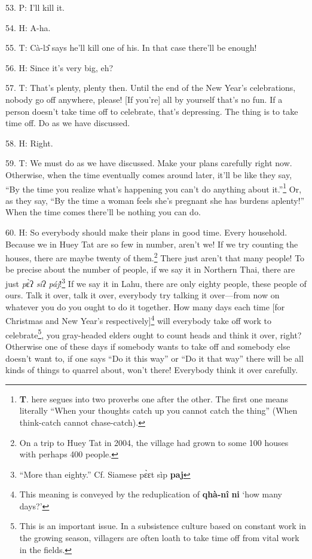 53. P: I'll kill it.

54. H: A-ha.

55. T: Cà-lɔ̂ says he'll kill one of his. In that case there'll be enough!

56. H: Since it's very big, eh?

57. T: That's plenty, plenty then. Until the end of the New Year's celebrations,
nobody go off anywhere, please! [If you're] all by yourself that's no fun. If
a person doesn't take time off to celebrate, that's depressing. The thing is to
take time off. Do as we have discussed.

58. H: Right.

59. T: We must do as we have discussed. Make your plans carefully right now.
Otherwise, when the time eventually comes around later, it'll be like they say,
``By the time you realize what's happening you can't do anything about it.''\footnote{\textbf{T}. here segues into two proverbs one after the other. The first one means literally ``When your thoughts catch up you cannot catch the thing'' (When think-catch cannot chase-catch).}
Or, as they say, ``By the time a woman feels she's pregnant she has burdens aplenty!''
When the time comes there'll be nothing you can do.

60. H: So everybody should make their plans in good time. Every household. Because
we in Huey Tat are so few in number, aren't we! If we try counting the houses,
there are maybe twenty of them.\footnote{On a trip to Huey Tat in 2004, the village had grown to some 100 houses with perhaps 400 people.} There just aren't that many people! To be
precise about the number of people, if we say it in Northern Thai, there are just
\textit{p}ɛ̀ʔ\textit{ sî}ʔ\textit{ páj}!\footnote{``More than eighty.'' Cf. Siamese pɛ̀ɛt sìp \textbf{paj}} If we say it in Lahu, there
are only eighty people, these people of ours. Talk it over, talk it over, everybody
try talking it over---from now on whatever you do you ought to do it together.
How many days each time [for Christmas and New Year's respectively]\footnote{This meaning is conveyed by the reduplication of \textbf{qhà-nî} \textbf{ni} `how many days?'} will
everybody take off work to celebrate\footnote{This is an important issue. In a subsistence culture based on constant work in the growing season, villagers are often loath to take time off from vital work in the fields.}, you gray-headed elders ought to count
heads and think it over, right?  Otherwise one of these
days if somebody wants to take off and somebody else doesn't want to, if one says
``Do it this way'' or ``Do it that way'' there will be all kinds of things to quarrel
about, won't there! Everybody think it over carefully.

